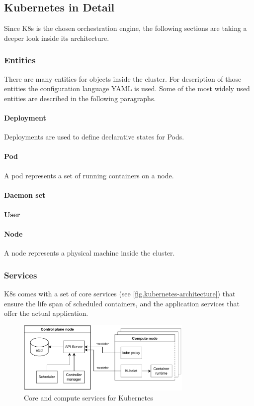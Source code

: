 \subsection{Kubernetes in Detail}
Since \ac{K8s} is the chosen orchestration engine, the following sections are taking a deeper look inside its architecture.

\subsubsection{Entities}
There are many entities for objects inside the cluster. For description of those entities the configuration language YAML is used. Some of the most widely used entities are described in the following paragraphs.
\paragraph{Deployment} Deployments are used to define declarative states for Pods.
\paragraph{Pod} A pod represents a set of running containers on a node.
\paragraph{Daemon set}
\paragraph{User}
\paragraph{Node} A node represents a physical machine inside the cluster.

\subsubsection{Services}
\ac{K8s} comes with a set of core services (see \autoref{fig.kubernetes-architecture}) that ensure the life span of scheduled containers, and the application services that offer the actual application.
\begin{figure}[h]
	\centering
	\includegraphics[width=0.75\textwidth]{Figures/kubernetes-architecture.pdf}
	\caption{Core and compute services for Kubernetes}
	\label{fig.kubernetes-architecture}
\end{figure}

